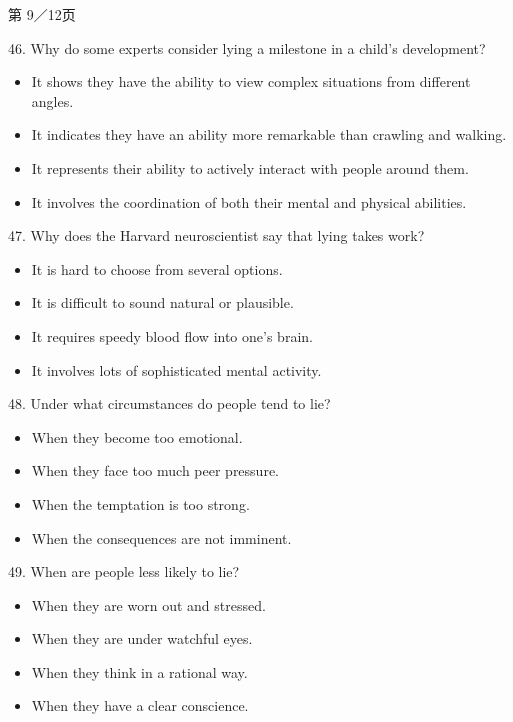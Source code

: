 \documentclass[UTF8,11pt]{ctexart}
\begin{document}
第 9／12页


46. Why do some experts consider lying a milestone in a child's development?


\begin{itemize}[leftmargin=2em,itemsep=.2em,topsep=.4em]\item[A.] It shows they have the ability to view complex situations from different angles.
\item[B.] It indicates they have an ability more remarkable than crawling and walking.
\item[C.] It represents their ability to actively interact with people around them.
\item[D.] It involves the coordination of both their mental and physical abilities.
\end{itemize}

47. Why does the Harvard neuroscientist say that lying takes work?


\begin{itemize}[leftmargin=2em,itemsep=.2em,topsep=.4em]\item[A.] It is hard to choose from several options.
\item[B.] It is difficult to sound natural or plausible.
\item[C.] It requires speedy blood flow into one's brain.
\item[D.] It involves lots of sophisticated mental activity.
\end{itemize}

48. Under what circumstances do people tend to lie?


\begin{itemize}[leftmargin=2em,itemsep=.2em,topsep=.4em]\item[A.] When they become too emotional.
\item[B.] When they face too much peer pressure.
\item[C.] When the temptation is too strong.
\item[D.] When the consequences are not imminent.
\end{itemize}

49. When are people less likely to lie?


\begin{itemize}[leftmargin=2em,itemsep=.2em,topsep=.4em]\item[A.] When they are worn out and stressed.
\item[B.] When they are under watchful eyes.
\item[C.] When they think in a rational way.
\item[D.] When they have a clear conscience.
\end{itemize}
\end{document}
